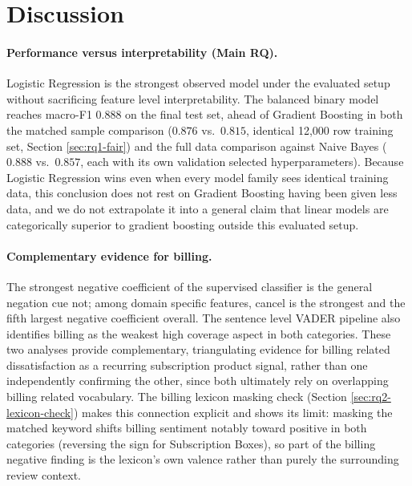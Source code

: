 \documentclass[11pt,a4paper,DIV=12]{scrartcl}
\begin{document}
\section{Discussion}
\label{sec:discussion}

\paragraph{Performance versus interpretability (Main RQ).}
Logistic Regression is the strongest observed model under the
evaluated setup without sacrificing feature level interpretability. The
balanced binary model reaches macro-F1 $0.888$ on the final test set, ahead of
Gradient Boosting in both the matched sample comparison ($0.876$ vs.\
$0.815$, identical 12,000 row training set, Section \ref{sec:rq1-fair}) and the
full data comparison against Naive Bayes ($0.888$ vs.\ $0.857$, each with its
own validation selected hyperparameters). Because
Logistic Regression wins even when every model family sees identical training
data, this conclusion does not rest on Gradient Boosting having been given
less data, and we do not extrapolate it into a general claim that linear
models are categorically superior to gradient boosting outside this evaluated
setup.

\paragraph{Complementary evidence for billing.}
The strongest negative coefficient of the supervised classifier is the general
negation cue not; among domain specific features, cancel is the
strongest and the fifth largest negative coefficient overall. The
sentence level VADER pipeline also identifies billing as the weakest
high coverage aspect in both categories. These two analyses provide
complementary, triangulating evidence for billing related
dissatisfaction as a recurring subscription product signal, rather than one
independently confirming the other, since both ultimately rely on overlapping
billing related vocabulary. The billing lexicon masking check (Section
\ref{sec:rq2-lexicon-check}) makes this connection explicit and shows its
limit: masking the matched keyword shifts billing sentiment notably toward
positive in both categories (reversing the sign for Subscription Boxes), so
part of the billing negative finding is the lexicon's own valence rather than
purely the surrounding review context.
\end{document}
